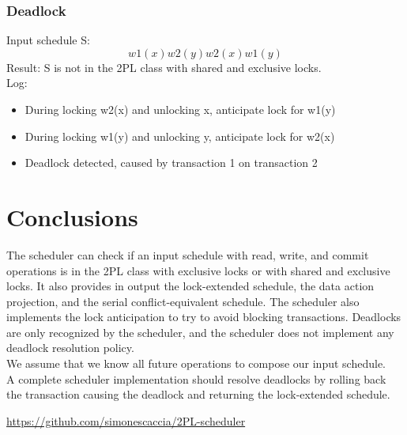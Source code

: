 \documentclass{article}
\begin{document}
\subsubsection{Deadlock}
Input schedule S:
$$w1(x) w2(y) w2(x) w1(y)$$
Result: S is not in the 2PL class with shared and exclusive locks.
\\
Log:
\begin{itemize}
    \item During locking w2(x) and unlocking x, anticipate lock for w1(y)
    \item During locking w1(y) and unlocking y, anticipate lock for w2(x)
    \item Deadlock detected, caused by transaction 1 on transaction 2
\end{itemize}
\newpage
\section{Conclusions}
The scheduler can check if an input schedule with read, write, and commit operations is in the 2PL class with exclusive locks or with shared and exclusive locks. It also provides in output the lock-extended schedule, the data action projection, and the serial conflict-equivalent schedule. The scheduler also implements the lock anticipation to try to avoid blocking transactions. Deadlocks are only recognized by the scheduler, and the scheduler does not implement any deadlock resolution policy.
\\
We assume that we know all future operations to compose our input schedule.
\\
A complete scheduler implementation should resolve deadlocks by rolling back the transaction causing the deadlock and returning the lock-extended schedule.
\newpage
\begin{thebibliography}{1}
     \url{https://github.com/simonescaccia/2PL-scheduler}
\end{thebibliography}
\end{document}

